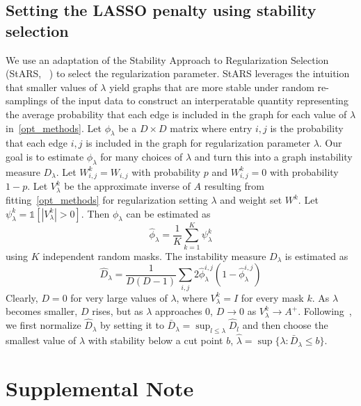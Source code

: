 \documentclass{article}
\newcommand{\beginsupplement}{%
        \setcounter{table}{0}
        \renewcommand{\thetable}{S\arabic{table}}%
        \setcounter{figure}{0}
        \renewcommand{\thefigure}{S\arabic{figure}}%
     }
\begin{document}
\subsection{Setting the LASSO penalty using stability selection}
We use an adaptation of the Stability Approach to Regularization Selection (StARS, ~\cite{Liu2010})
to select the regularization parameter. StARS leverages the intuition that smaller values
of $\lambda$ yield graphs that are more stable under random re-samplings of the input data
to construct an interperatable quantity representing the average probability
that each edge is included in the graph for each value of $\lambda$ in~\eqref{opt_methods}.
Let $\phi_{\lambda}$ be a $D\times D$ matrix where entry $i, j$ is the probability that each edge
$i,j$ is included in the graph for regularization parameter $\lambda$. Our goal is to
estimate $\phi_{\lambda}$ for many choices of $\lambda$ and
turn this into a graph instability measure $D_\lambda$.
Let $W^k_{i,j} = W_{i,j}$ with probability $p$ and $W^k_{i,j} = 0$ with
probability $1-p$. Let $V_{\lambda}^k$ be the approximate inverse of
$A$ resulting from fitting~\eqref{opt_methods} for regularization setting
$\lambda$ and weight set $W^k$. Let $\psi^k_{\lambda} = \mathds{1}[|V^k_{\lambda}| > 0]$.
Then  $\phi_{\lambda}$ can be estimated as
\begin{equation}
\hat{\phi}_{\lambda} = \frac{1}{K} \sum_{k=1}^K \psi^{k}_{\lambda}
\end{equation}
using $K$ independent random masks.
The instability measure $D_\lambda$ is estimated as~\cite{Liu2010}
\begin{equation}
\hat{D}_\lambda = \frac{1}{D(D-1)} \sum_{i, j} 2 \hat{\phi}^{i, j}_\lambda(1-\hat{\phi}^{i, j}_\lambda)
\end{equation}
Clearly, $D = 0$ for very large values of $\lambda$, where $V^k_\lambda = I$
for every mask $k$. As $\lambda$ becomes smaller, $D$ rises, but as $\lambda$ approaches $0$,
$D\rightarrow 0$ as $V^k_\lambda \rightarrow A^+$. Following~\cite{Liu2010},
we first normalize $\hat{D}_\lambda$ by setting it to
$\bar{D}_\lambda = \sup_{l \leq \lambda} \hat{D}_l$ and then choose the smallest
value of $\lambda$ with stability below a cut point $b$,
$\hat{\lambda} = \sup \{ \lambda : \bar{D}_\lambda \leq b \}$.


\printbibliography

\beginsupplement
\section*{Supplemental Note}
\end{document}

